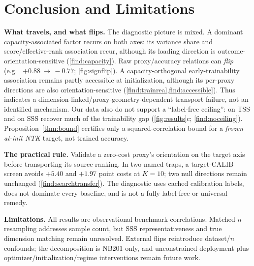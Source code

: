 
\section{Conclusion and Limitations}
\label{sec:discussion}

\textbf{What travels, and what flips.}
\label{sec:disc-refute}\label{sec:disc-measure}\label{sec:disc-cross}\label{sec:disc-org}\label{sec:conclusion}%
The diagnostic picture is mixed. A dominant capacity-associated factor recurs
on both axes: its variance share and score/effective-rank association recur,
although its loading direction is outcome-orientation-sensitive
(\cref{find:capacity}). Raw proxy/accuracy relations can \emph{flip} (e.g.\
 $+0.88\,{\to}\,-0.77$; \cref{fig:signflip}). A
capacity-orthogonal early-trainability association remains partly accessible at
initialization, although its per-proxy directions are also orientation-sensitive
(\cref{find:trainreal,find:accessible}). Thus \px{cond-sum} indicates a
dimension-linked/proxy-geometry-dependent transport failure, not an identified
mechanism. Our data also do not support a ``label-free ceiling'': \px{meco} on
TSS and \px{synflow} on SSS recover much of the trainability gap
(\cref{fig:results}c; \cref{find:noceiling}). Proposition~\ref{thm:bound}
certifies only a squared-correlation bound for a \emph{frozen at-init NTK}
target, not trained accuracy.

\textbf{The practical rule.}
Validate a zero-cost proxy's orientation on the target axis before transporting
its source ranking. In two named traps, a target-CALIB screen avoids $+5.40$ and
$+1.97$ point costs at $K{=}10$; two null directions remain unchanged
(\cref{find:searchtransfer}). The diagnostic uses cached calibration labels,
does not dominate every baseline, and is not a fully label-free or universal
remedy.

\textbf{Limitations.}
\label{sec:limitations}%
All results are observational benchmark correlations. Matched-$n$ resampling
addresses sample count, but SSS representativeness and true dimension matching
remain unresolved. External flips reintroduce dataset/$n$ confounds; the
decomposition is NB201-only, and unconstrained deployment plus
optimizer/initialization/regime interventions remain future work.
